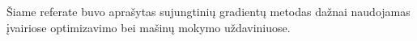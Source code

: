 \documentclass{VUMIFPSmagistrinis}
\begin{document}

Šiame referate buvo aprašytas sujungtinių gradientų metodas dažnai naudojamas įvairiose optimizavimo bei mašinų mokymo uždaviniuose.



\printbibliography[heading=bibintoc]  %

\end{document}
